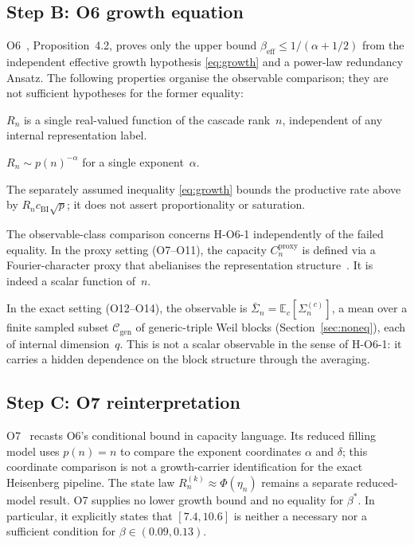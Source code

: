 \documentclass[11pt,a4paper]{article}
\newcommand{\Rn}{R_n}
\newcommand{\Sn}{\bar{\Sigma}_n}
\newcommand{\bstar}{\beta^{*}}
\begin{document}
\subsection{Step B: O6 growth equation}
\label{sec:stepB}

O6~\cite{Beau2026a10}, Proposition~4.2, proves only the upper bound
$\beta_{\mathrm{eff}}\leq1/(\alpha+1/2)$ from the independent effective growth hypothesis
\eqref{eq:growth} and a power-law redundancy Ansatz.
The following properties organise the observable comparison; they are not sufficient hypotheses
for the former equality:

\begin{description}[style=nextline]
\item[H-O6-1 (Scalar observable)]
$\Rn$ is a single real-valued function of the cascade rank~$n$,
independent of any internal representation label.
\item[H-O6-2 (Power-law decay)]
$\Rn\sim p(n)^{-\alpha}$ for a single exponent~$\alpha$.
\item[H-O6-3 (Effective growth bound)]
The separately assumed inequality \eqref{eq:growth} bounds the productive rate above by
$\Rn c_{\mathrm{BI}}\sqrt p$; it does not assert proportionality or saturation.
\end{description}

The observable-class comparison concerns H-O6-1 independently of the failed equality.
In the proxy setting (O7--O11), the capacity $C_n^{\mathrm{proxy}}$
is defined via a Fourier-character proxy that abelianises the
representation structure~\cite{Beau2026a11}.
It is indeed a scalar function of~$n$.

In the exact setting (O12--O14), the observable is
$\Sn = \mathbb{E}_c[\Sigma_n^{(c)}]$, a mean over a finite sampled subset
$\mathcal{C}_{\mathrm{gen}}$ of generic-triple Weil blocks (Section~\ref{sec:noneq}),
each of internal dimension~$q$.
This is not a scalar observable in the sense of H-O6-1: it carries
a hidden dependence on the block structure through the averaging.

\subsection{Step C: O7 reinterpretation}
\label{sec:stepC}

O7~\cite{Beau2026a11} recasts O6's conditional bound in capacity language.
Its reduced filling model uses $p(n)=n$ to compare the exponent coordinates $\alpha$ and $\delta$;
this coordinate comparison is not a growth-carrier identification for the exact Heisenberg pipeline.
The state law $R_n^{(k)}\approx\Phi(\eta_n)$ remains a separate reduced-model result.
O7 supplies no lower growth bound and no equality for $\bstar$.
In particular, it explicitly states that $[7.4,10.6]$ is neither a necessary nor a sufficient
condition for $\beta\in(0.09,0.13)$.
\end{document}

